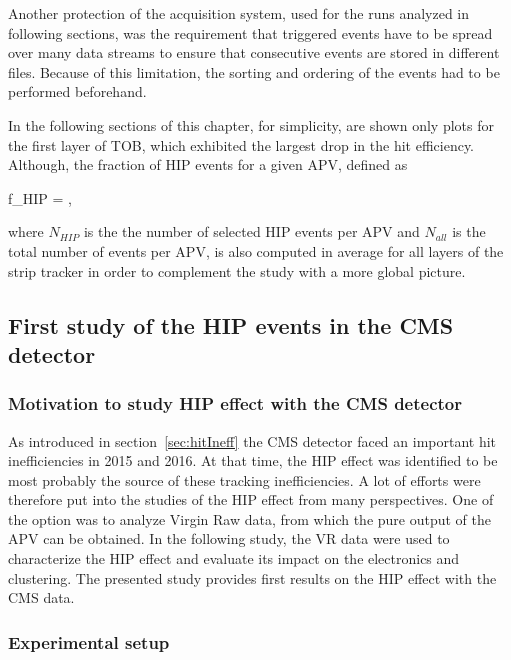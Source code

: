 Another protection of the acquisition system, used for the runs analyzed in following sections, was the requirement that triggered events have to be spread over many data streams to ensure that consecutive events are stored in different files. Because of this limitation, the sorting and ordering of the events had to be performed beforehand.

In the following sections of this chapter, for simplicity, are shown only plots for the first layer of TOB, which exhibited the largest drop in the hit efficiency. Although, the fraction of HIP events for a given APV, defined as


{
f_{HIP} = ,
}

where $N_{HIP}$ is the the number of selected HIP events per APV and $N_{all}$ is the total number of events per APV, is also computed in average for all layers of the strip tracker in order to complement the study with a more global picture.


\subsection{First study of the HIP events in the CMS detector~\label{sec:firstStudy}}

\subsubsection{Motivation to study HIP effect with the CMS detector}

As introduced in section~\ref{sec:hitIneff} the CMS detector faced an important hit inefficiencies in 2015 and 2016. At that time, the HIP effect was identified to be most probably the source of these tracking inefficiencies. A lot of efforts were therefore put into the studies of the HIP effect from many perspectives. One of the option was to analyze Virgin Raw data, from which the pure output of the APV can be obtained. In the following study, the VR data were used to characterize the HIP effect and evaluate its impact on the electronics and clustering. The presented study provides first results on the HIP effect with the CMS data.

\subsubsection{Experimental setup} 

